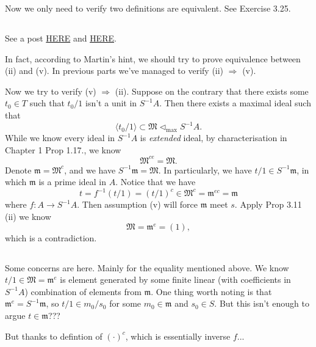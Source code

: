 Now we only need to verify two definitions are equivalent. See \cite{altman} Exercise 3.25.

\subsection{}

See a post \href{http://math_research.uct.ac.za/marques/US/AMCh3forSophiesAGSeminar.pdf}{HERE} and \href{https://math.stackexchange.com/questions/308292/s-t-be-multiplicatively-closed-sets-in-the-ring-r-such-that-s-subseteq-t}{HERE}.

In fact, according to Martin's hint, we should try to prove equivalence between (ii) and (v). In previous parts we've managed to verify (ii) $\Rightarrow$ (v).

Now we try to verify (v) $\Rightarrow$ (ii). Suppose on the contrary that there exists some $t_0\in T$ such that $t_0/1$ isn't a unit in $S^{-1}A$. Then there exists a maximal ideal such that \[\langle t_0/1\rangle \subset \mathfrak M \triangleleft_{\text{max}}S^{-1}A.\] While we know every ideal in $S^{-1}A$ is \textit{extended} ideal, by characterisation in Chapter 1 Prop 1.17., we know \[\mathfrak M^{ce}=\mathfrak M.\] Denote $\mathfrak m=\mathfrak M^c$, and we have $S^{-1}\mathfrak m=\mathfrak M$. In particularly, we have $t/1\in S^{-1}\mathfrak m$, in which $\mathfrak m$ is a prime ideal in $A$. 
Notice that we have 
\[t=f^{-1}(t/1)=(t/1)^c\in\mathfrak M^c=\mathfrak m^{ec}=\mathfrak m\] where $f:A\to S^{-1}A$.
Then assumption (v) will force $\mathfrak m$ meet $s$. Apply Prop 3.11 (ii) we know 
\[\mathfrak M=\mathfrak m^e=(1),\] which is a contradiction.

\subsection{}

Some concerns are here. Mainly for the equality mentioned above. We know $t/1\in \mathfrak M=\mathfrak m^e$ is element generated by some finite linear (with coefficients in $S^{-1}A$) combination of elements from $\mathfrak m$. One thing worth noting is that $\mathfrak m^e=S^{-1}\mathfrak m$, so $t/1\in m_0/s_0$ for some $m_0\in\mathfrak m$ and $s_0\in S$. But this isn't enough to argue $t\in\mathfrak m$??? 

But thanks to defintion of $(\cdot)^c$, which is essentially inverse $f$...

